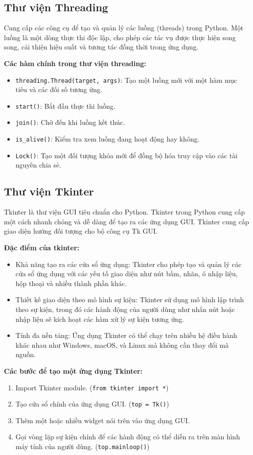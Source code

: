 \documentclass[a4paper]{article}
\begin{document}
\subsection{Thư viện Threading}
Cung cấp các công cụ để tạo và quản lý các luồng (threads) trong Python. Một luồng là một dòng thực thi độc lập, cho phép các tác vụ được thực hiện song song, cải thiện hiệu suất và tương tác đồng thời trong ứng dụng.

\textbf{Các hàm chính trong thư viện threading:}
\begin{itemize}
    \item \texttt{threading.Thread(target, args)}: Tạo một luồng mới với một hàm mục tiêu và các đối số tương ứng.
    \item \texttt{start()}: Bắt đầu thực thi luồng.
    \item \texttt{join()}: Chờ đến khi luồng kết thúc.
    \item \texttt{is\_alive()}: Kiểm tra xem luồng đang hoạt động hay không.
    \item \texttt{Lock()}: Tạo một đối tượng khóa mới để đồng bộ hóa truy cập vào các tài nguyên chia sẻ.
\end{itemize}
\subsection{Thư viện Tkinter}
Tkinter là thư viện GUI tiêu chuẩn cho Python. Tkinter trong Python cung cấp một cách nhanh chóng và dễ dàng để tạo ra các ứng dụng GUI. Tkinter cung cấp giao diện hướng đối tượng cho bộ công cụ Tk GUI.

\textbf{Đặc điểm của tkinter:}
\begin{itemize}
    \item Khả năng tạo ra các cửa sổ ứng dụng: Tkinter cho phép tạo và quản lý các cửa sổ ứng dụng với các yếu tố giao diện như nút bấm, nhãn, ô nhập liệu, hộp thoại và nhiều thành phần khác.
    \item Thiết kế giao diện theo mô hình sự kiện: Tkinter sử dụng mô hình lập trình theo sự kiện, trong đó các hành động của người dùng như nhấn nút hoặc nhập liệu sẽ kích hoạt các hàm xử lý sự kiện tương ứng.
    \item Tính đa nền tảng: Ứng dụng Tkinter có thể chạy trên nhiều hệ điều hành khác nhau như Windows, macOS, và Linux mà không cần thay đổi mã nguồn.
\end{itemize}

\textbf{Các bước để tạo một ứng dụng Tkinter:}
\begin{enumerate}
    \item Import Tkinter module. (\texttt{from tkinter import *})
    \item Tạo cửa sổ chính của ứng dụng GUI. (\texttt{top = Tk()})
    \item Thêm một hoặc nhiều widget nói trên vào ứng dụng GUI.
    \item Gọi vòng lặp sự kiện chính để các hành động có thể diễn ra trên màn hình máy tính của người dùng. (\texttt{top.mainloop()})
\end{enumerate}
\end{document}
